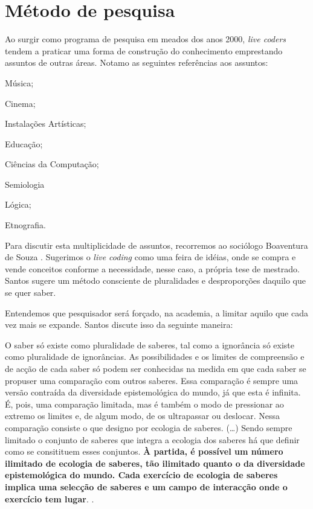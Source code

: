 \section{Método de pesquisa}\label{conjunto_conhecimentos}

Ao surgir como programa de pesquisa em meados dos anos 2000, \emph{live coders} tendem a praticar uma forma de construção do conhecimento emprestando assuntos de outras áreas. Notamo as seguintes referências aos assuntos: \begin{inparaenum}[(1)]
\item Música;
\item Cinema;
\item Instalações Artísticas;
\item Educação;
\item Ciências da Computação;
\item Semiologia
\item Lógica;
\item Etnografia.
\end{inparaenum}\label{par:metodo1}

Para discutir esta multiplicidade de assuntos, recorremos ao sociólogo Boaventura de Souza . Sugerimos o \emph{live coding} como uma feira de idéias, onde se compra e vende conceitos conforme a necessidade, nesse caso, a própria tese de mestrado. Santos sugere um método consciente de pluralidades e desproporções daquilo que se quer saber. 

Entendemos que pesquisador será forçado, na academia, a limitar aquilo que cada vez mais se expande. Santos discute isso da seguinte maneira:

\begin{citacao}
O saber só existe como pluralidade de saberes, tal como a ignorância só existe como pluralidade de ignorâncias. As possibilidades e os limites de compreensão e de acção de cada saber só podem ser conhecidas na medida em que cada saber se propuser uma comparação com outros saberes. Essa comparação é sempre uma versão contraída da diversidade epistemológica do mundo, já que esta é infinita. É, pois, uma comparação limitada, mas é também o modo de pressionar ao extremo os limites e, de algum modo, de os ultrapassar ou deslocar. Nessa comparação consiste o que designo por ecologia de saberes. (\ldots) Sendo sempre limitado o conjunto de saberes que integra a ecologia dos saberes há que definir como se consitituem esses conjuntos. \textbf{À partida, é possível um número ilimitado de ecologia de saberes, tão ilimitado quanto o da diversidade epistemológica do mundo. Cada exercício de ecologia de saberes implica uma selecção de saberes e um campo de interacção onde o exercício tem lugar}. \cite[p.~28-30]{santos_filosofia_2008}.
\end{citacao}


